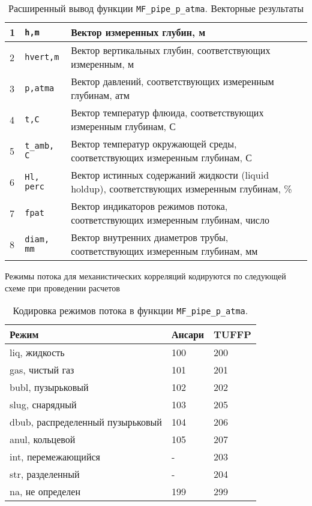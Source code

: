 \begin{table}[H]
	\caption{Расширенный вывод функции \texttt{MF_pipe_p_atma}. Векторные результаты}
	\label{table:res_list_pipe_crv}
	\begin{tabular}{p{}p{}p{}}
		1 & \texttt{h,m} & Вектор измеренных глубин, м   \\ \hline
		
		2 & \texttt{hvert,m} & Вектор вертикальных глубин, соответствующих измеренным, м   \\ \hline
		3 & \texttt{p,atma} & Вектор давлений, соответствующих измеренным глубинам, атм   \\ \hline
		4 & \texttt{t,C} & Вектор температур флюида, соответствующих измеренным глубинам, С   \\ \hline
		5 & \texttt{t_amb, C} & Вектор температур окружающей среды, соответствующих измеренным глубинам, С   \\ \hline
		6 & \texttt{Hl, perc} & Вектор истинных содержаний жидкости (liquid holdup), соответствующих измеренным глубинам, \%   \\ \hline
		7 & \texttt{fpat} & Вектор индикаторов режимов потока, соответствующих измеренным глубинам, число   \\ \hline
		8 & \texttt{diam, mm} & Вектор внутренних диаметров трубы, соответствующих измеренным глубинам, мм \\ \hline
		
	\end{tabular}
\end{table}

Режимы потока для механистических корреляций кодируются по следующей схеме при проведении расчетов 
\begin{table}[H]
	\caption{Кодировка режимов потока в функции \texttt{MF_pipe_p_atma}. }
	\label{table:res_list_pipe_fpat}
	\begin{tabular}{p{}p{}p{}}
		
		Режим & Ансари & TUFFP\\ \hline
		liq, жидкость & 100 & 200\\ \hline
		gas, чистый газ & 101 & 201\\ \hline
		bubl, пузырьковый & 102 & 202\\ \hline
		slug, снарядный & 103 & 205\\ \hline
		dbub, распределенный пузырьковый & 104 & 206\\ \hline
		anul, кольцевой & 105 & 207\\ \hline
		int, перемежающийся & - & 203\\ \hline
		str, разделенный & - & 204\\ \hline
		na, не определен & 199 & 299\\ \hline
		
		
	\end{tabular}
\end{table}

